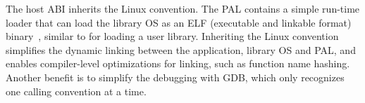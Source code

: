 

The host ABI inherits the \graphenearch{} Linux convention. %
The PAL contains a simple run-time loader that can load the library OS as an ELF (executable and linkable format) binary~\cite{elf-format}, similar to  for loading a user library.
Inheriting the \graphenesgx{} Linux convention
simplifies the dynamic linking between the application, library OS and PAL,
and enables compiler-level optimizations for linking,
such as function name hashing.
Another benefit is to simplify the debugging with GDB, which only recognizes one calling convention at a time.








